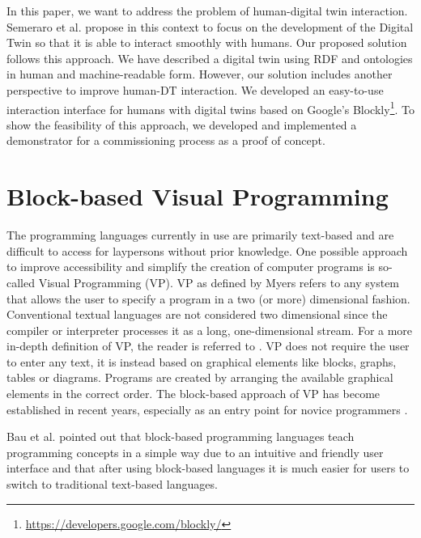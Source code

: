 \documentclass[runningheads]{llncs}
\begin{document}
In this paper, we want to address the problem of human-digital twin interaction.
Semeraro et al. \cite{SEMERARO2021103469} propose in this context to focus on the development of the Digital Twin so that it is able to interact smoothly with humans.
Our proposed solution follows this approach.
We have described a digital twin using RDF and ontologies in human and machine-readable form.
However, our solution includes another perspective to improve human-DT interaction.
We developed an easy-to-use interaction interface for humans with digital twins based on Google's Blockly\footnote{\url{https://developers.google.com/blockly/}}.
To show the feasibility of this approach, we developed and implemented a demonstrator for a commissioning process as a proof of concept.

\section{Block-based Visual Programming}
The programming languages currently in use are primarily text-based and are difficult to access for laypersons without prior knowledge.
One possible approach to improve accessibility and simplify the creation of computer programs is so-called Visual Programming (VP).
VP as defined by Myers \cite{myers1990taxonomies} refers to any system that allows the user to specify a program in a two (or more) dimensional fashion. Conventional textual languages are not considered two dimensional since the compiler or interpreter processes it as a long, one-dimensional stream. For a more in-depth definition of VP, the reader is referred to \cite{burnett1995visual}. 
VP does not require the user to enter any text, it is instead based on graphical elements like blocks, graphs, tables or diagrams.
Programs are created by arranging the available graphical elements in the correct order.
The block-based approach of VP has become established in recent years, especially as an entry point for novice programmers 
\cite{moors2018transitioning} \cite{weintrop2017blocks} \cite{chao2016exploring} \cite{HUNDHAUSEN200722} \cite{10.1145/2787622.2787712}.

Bau et al. \cite{1011453015455} pointed out that block-based programming languages teach programming concepts in a simple way due to an intuitive and friendly user interface and that after using block-based languages it is much easier for users to switch to traditional text-based languages.
\end{document}
